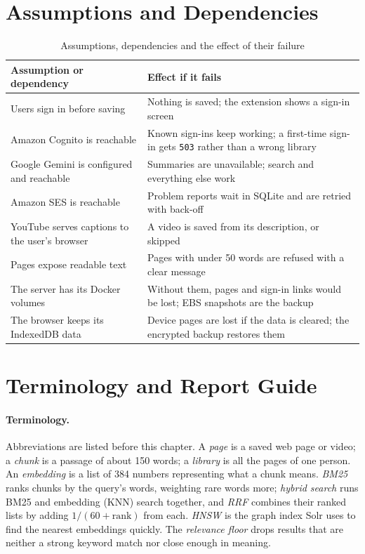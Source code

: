 \section{Assumptions and Dependencies}

\begin{table}[H]
\centering
\small
\begin{tabularx}{\textwidth}{L L}
\toprule
\textbf{Assumption or dependency} & \textbf{Effect if it fails} \\
\midrule
Users sign in before saving & Nothing is saved; the extension shows a sign-in screen \\
Amazon Cognito is reachable & Known sign-ins keep working; a first-time sign-in gets \texttt{503} rather than a wrong library \\
Google Gemini is configured and reachable & Summaries are unavailable; search and everything else work \\
Amazon SES is reachable & Problem reports wait in SQLite and are retried with back-off \\
YouTube serves captions to the user's browser & A video is saved from its description, or skipped \\
Pages expose readable text & Pages with under 50 words are refused with a clear message \\
The server has its Docker volumes & Without them, pages and sign-in links would be lost; EBS snapshots are the backup \\
The browser keeps its IndexedDB data & Device pages are lost if the data is cleared; the encrypted backup restores them \\
\bottomrule
\end{tabularx}
\caption{Assumptions, dependencies and the effect of their failure}
\label{tab:assumptions}
\end{table}

\section{Terminology and Report Guide}

\paragraph{Terminology.} Abbreviations are listed before this chapter. A
\emph{page} is a saved web page or video; a \emph{chunk} is a passage of
about 150 words; a \emph{library} is all the pages of one person. An
\emph{embedding} is a list of 384 numbers representing what a chunk means.
\emph{BM25} ranks chunks by the query's words, weighting rare words more;
\emph{hybrid search} runs BM25 and embedding (KNN) search together, and
\emph{RRF} combines their ranked lists by adding $1/(60+\text{rank})$ from
each. \emph{HNSW} is the graph index Solr uses to find the nearest embeddings
quickly. The \emph{relevance floor} drops results that are neither a strong
keyword match nor close enough in meaning.

